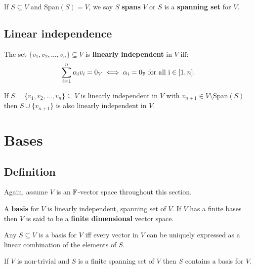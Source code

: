 \documentclass[../Year1.tex]{subfiles}
\begin{document}
\begin{definition}
    If $S\subseteq V$ and $\text{Span}(S)=V$, we say $S$ \textbf{spans} $V$ or $S$ is a \textbf{spanning set} for $V$.
\end{definition}

\subsection{Linear independence}
\begin{definition}
    The set $\{v_1,v_2,\ldots,v_n\}\subseteq V$ is \textbf{linearly independent} in $V$ iff: \[
        \sum_{i=1}^n\alpha_i v_i = 0_V \iff \alpha_i=0_{\mathbb{F}} \ \text{\textcolor{black}{ for all }}\mathrm{i}\in[1,n]\textcolor{black}{.}
    \]
\end{definition}

\vspace{-20pt}

\begin{theorem}
    If $S = \{v_1,v_2,\ldots,v_n\}\subseteq V$ is linearly independent in $V$ with $v_{n+1}\in V\setminus \text{Span}(S)$ then $S\cup\{v_{n+1}\}$ is also linearly independent in $V$. 
\end{theorem}

\section{Bases}

\subsection{Definition}
Again, assume $V$ is an $\mathbb{F}$-vector space throughout this section.
\begin{definition}[Bases]
    A \textbf{basis} for $V$ is linearly independent, spanning set of $V$. If $V$ has a finite bases then $V$ is said to be a \textbf{finite dimensional} vector space.
\end{definition}

\begin{theorem}
    Any $S\subseteq V$ is a basis for $V$ iff every vector in $V$ can be uniquely expressed as a linear combination of the elements of $S$.
\end{theorem}

\begin{theorem}
    If $V$ is non-trivial and $S$ is a finite spanning set of $V$ then $S$ contains a basis for $V$.
\end{theorem}
\end{document}
